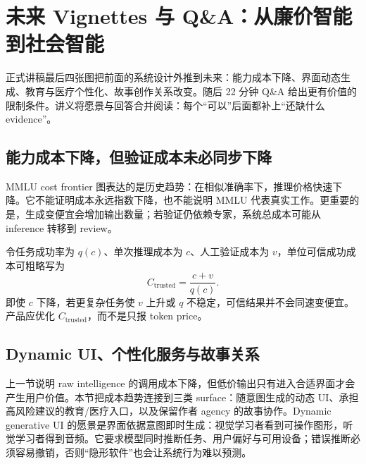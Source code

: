 \section{未来 Vignettes 与 Q\&A：从廉价智能到社会智能}

正式讲稿最后四张图把前面的系统设计外推到未来：能力成本下降、界面动态生成、教育与医疗个性化、故事创作关系改变。随后 22 分钟 Q\&A 给出更有价值的限制条件。讲义将愿景与回答合并阅读：每个“可以”后面都补上“还缺什么 evidence”。

\subsection{能力成本下降，但验证成本未必同步下降}

MMLU cost frontier 图表达的是历史趋势：在相似准确率下，推理价格快速下降。它不能证明成本永远指数下降，也不能说明 MMLU 代表真实工作。更重要的是，生成变便宜会增加输出数量；若验证仍依赖专家，系统总成本可能从 inference 转移到 review。


令任务成功率为 $q(c)$、单次推理成本为 $c$、人工验证成本为 $v$，单位可信成功成本可粗略写为
\[
C_{\text{trusted}}=\frac{c+v}{q(c)}.
\]
即使 $c$ 下降，若更复杂任务使 $v$ 上升或 $q$ 不稳定，可信结果并不会同速变便宜。产品应优化 $C_{\text{trusted}}$，而不是只报 token price。


\subsection{Dynamic UI、个性化服务与故事关系}

上一节说明 raw intelligence 的调用成本下降，但低价输出只有进入合适界面才会产生用户价值。本节把成本趋势连接到三类 surface：随意图生成的动态 UI、承担高风险建议的教育/医疗入口，以及保留作者 agency 的故事协作。Dynamic generative UI 的愿景是界面依据意图即时生成：视觉学习者看到可操作图形，听觉学习者得到音频。它要求模型同时推断任务、用户偏好与可用设备；错误推断必须容易撤销，否则“隐形软件”也会让系统行为难以预测。


